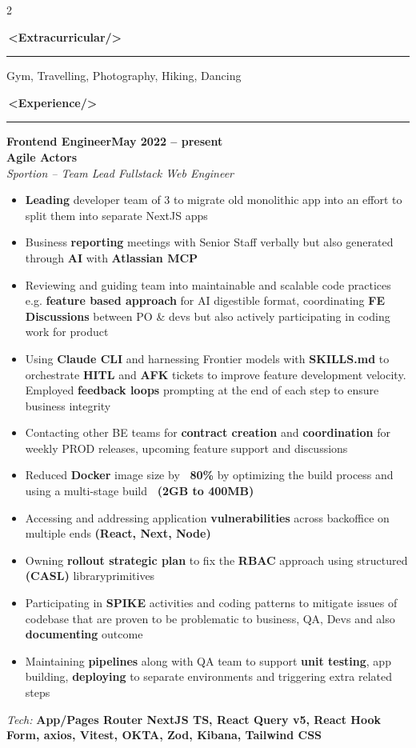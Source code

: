 \documentclass[10pt,a4paper]{article}
\newcommand{\faBicycle}{}%
\newcommand{\faBriefcase}{}%
\newcommand{\xmlsection}[2][]{%
    \par\vspace{6pt}%
    {\Large\bfseries\color{accent}#1\,\textless#2/\textgreater}%
    \par\vspace{2pt}%
    {\color{accent}\rule{\linewidth}{0.6pt}}\par\vspace{4pt}%
}
\newcommand{\xmlsidesection}[2][]{%
    \par\vspace{6pt}%
    {\large\bfseries\color{accent}#1\,\textless#2/\textgreater}%
    \par\vspace{2pt}%
    {\color{accent}\rule{\linewidth}{0.5pt}}\par\vspace{2pt}%
}
\newcommand{\jobentry}[4]{%
    \par\vspace{4pt}%
    \noindent\textbf{#1}\hfill\textbf{#2}\\%
    \textbf{#3}\\%
    \textit{#4}\par\vspace{2pt}%
}
\newenvironment{cvitems}{%
    \begin{itemize}[leftmargin=1.1em,topsep=2pt,itemsep=1pt,parsep=0pt]%
}{%
    \end{itemize}%
}
\newcommand{\techstack}[1]{%
    \vspace{2pt}\noindent\textit{Tech:} \textbf{#1}\par%
}
\begin{document}
\begin{paracol}{2}
\xmlsidesection[\faBicycle]{Extracurricular}
Gym, Travelling, Photography, Hiking, Dancing

\switchcolumn

\xmlsection[\faBriefcase]{Experience}

\jobentry{Frontend Engineer}{May 2022 -- present}{Agile Actors}{Sportion -- Team Lead Fullstack Web Engineer}
\begin{cvitems}
    \item \textbf{Leading} developer team of 3 to migrate old monolithic app into an effort to split them into separate NextJS apps
    \item Business \textbf{reporting} meetings with Senior Staff verbally but also generated through \textbf{AI} with \textbf{Atlassian MCP}
    \item Reviewing and guiding team into maintainable and scalable code practices e.g. \textbf{feature based approach} for AI digestible format, coordinating \textbf{FE Discussions} between PO \& devs but also actively participating in coding work for product
    \item Using \textbf{Claude CLI} and harnessing Frontier models with \textbf{SKILLS.md} to orchestrate \textbf{HITL} and \textbf{AFK} tickets to improve feature development velocity. Employed \textbf{feedback loops} prompting at the end of each step to ensure business integrity
    \item Contacting other BE teams for \textbf{contract creation} and \textbf{coordination} for weekly PROD releases, upcoming feature support and discussions
    \item Reduced \textbf{Docker} image size by \textbf{~80\%} by optimizing the build process and using a multi-stage build \textbf{~(2GB to 400MB)}
    \item Accessing and addressing application \textbf{vulnerabilities} across backoffice on multiple ends \textbf{(React, Next, Node)}
    \item Owning \textbf{rollout strategic plan} to fix the \textbf{RBAC} approach using structured \textbf{(CASL)} libraryprimitives
    \item Participating in \textbf{SPIKE} activities and coding patterns to mitigate issues of codebase that are proven to be problematic to business, QA, Devs and also \textbf{documenting} outcome
    \item Maintaining \textbf{pipelines} along with QA team to support \textbf{unit testing}, app building, \textbf{deploying} to separate environments and triggering extra related steps
\end{cvitems}
\techstack{App/Pages Router NextJS TS, React Query v5, React Hook Form, axios, Vitest, OKTA, Zod, Kibana, Tailwind CSS}


\end{paracol}
\end{document}
